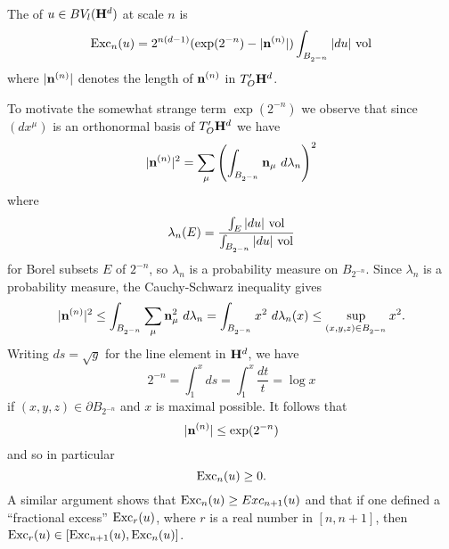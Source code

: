 \begin{definition}
The  of $u \in BV_l(\mathbf H^d)$ at scale $n$ is
$$\operatorname{Exc}_n(u) = 2^{n(d - 1)} (\exp(2^{-n}) - |\mathbf n^{(n)}|) \int_{B_{2^{-n}}} |du| ~\mathrm{vol}$$
where $|\mathbf n^{(n)}|$ denotes the length of $\mathbf n^{(n)}$ in $T_O' \mathbf H^d$.
\end{definition}

To motivate the somewhat strange term $\exp(2^{-n})$ we observe that since $(dx^\mu)$ is an orthonormal basis of $T_O' \mathbf H^d$ we have
$$|\mathbf n^{(n)}|^2 = \sum_\mu \left(\int_{B_{2^{-n}}} \mathbf n_\mu ~d\lambda_n\right)^2$$
where
$$\lambda_n(E) = \frac{\int_E |du|~\mathrm{vol}}{\int_{B_{2^{-n}}} |du| ~\mathrm{vol}}$$
for Borel subsets $E$ of $2^{-n}$, so $\lambda_n$ is a probability measure on $B_{2^{-n}}$.
Since $\lambda_n$ is a probability measure, the Cauchy-Schwarz inequality gives
$$|\mathbf n^{(n)}|^2 \leq \int_{B_{2^{-n}}} \sum_\mu \mathbf n_\mu^2 ~d\lambda_n = \int_{B_{2^{-n}}} x^2 ~d\lambda_n(x) \leq \sup_{(x, y, z) \in B_{2^{-n}}} x^2.$$
Writing $ds = \sqrt g$ for the line element in $\mathbf H^d$, we have
$$2^{-n} = \int_1^x ds = \int_1^x \frac{dt}{t} = \log x$$
if $(x, y, z) \in \partial B_{2^{-n}}$ and $x$ is maximal possible. It follows that
\begin{equation}\label{conormal length bound}
|\mathbf n^{(n)}| \leq \exp(2^{-n})
\end{equation}
and so in particular
$$\operatorname{Exc}_n(u) \geq 0.$$
A similar argument shows that $\operatorname{Exc}_n(u) \geq Exc_{n + 1}(u)$ and that if one defined a ``fractional excess'' $\operatorname{Exc}_r(u)$, where $r$ is a real number in $[n, n + 1]$, then $\operatorname{Exc}_r(u) \in [\operatorname{Exc}_{n + 1}(u), \operatorname{Exc}_n(u)]$.

